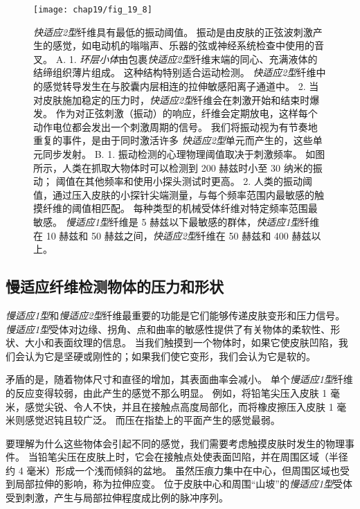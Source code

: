 \begin{figure}[htbp]
	\centering
	\texttt{[image: chap19/fig\_19\_8]}
	\caption{\textit{快适应2型}纤维具有最低的振动阈值。
		振动是由皮肤的正弦波刺激产生的感觉，如电动机的嗡嗡声、乐器的弦或神经系统检查中使用的音叉。
		A. 1. \textit{环层小体}由包裹\textit{快适应2型}纤维末端的同心、充满液体的结缔组织薄片组成。 这种结构特别适合运动检测。
		\textit{快适应2型}纤维中的感觉转导发生在与胶囊内层相连的拉伸敏感阳离子通道中。
		2. 当对皮肤施加稳定的压力时，\textit{快适应2型}纤维会在刺激开始和结束时爆发。
		作为对正弦刺激（振动）的响应，纤维会定期放电，这样每个动作电位都会发出一个刺激周期的信号。
		我们将振动视为有节奏地重复的事件，是由于同时激活许多 \textit{快适应2型}单元而产生的，这些单元同步发射\cite{talbot1968sense}。
		B. 1. 振动检测的心理物理阈值取决于刺激频率。
		如图所示，人类在抓取大物体时可以检测到 200 赫兹时小至 30 纳米的振动；
		阈值在其他频率和使用小探头测试时更高\cite{brisben1999detection}。
		2. 人类的振动阈值，通过压入皮肤的小探针尖端测量，与每个频率范围内最敏感的触摸纤维的阈值相匹配。 
		每种类型的机械受体纤维对特定频率范围最敏感。
		\textit{慢适应1型}纤维是 5 赫兹以下最敏感的群体，\textit{快适应1型}纤维在 10 赫兹和 50 赫兹之间，\textit{快适应2型}纤维在 50 赫兹和 400 赫兹以上\cite{mountcastle1972detection,johansson1982responses}。}
	\label{fig:19_8}
\end{figure}



\subsection{慢适应纤维检测物体的压力和形状}

\textit{慢适应1型}和\textit{慢适应2型}纤维最重要的功能是它们能够传递皮肤变形和压力信号。
\textit{慢适应1型}受体对边缘、拐角、点和曲率的敏感性提供了有关物体的柔软性、形状、大小和表面纹理的信息。
当我们触摸到一个物体时，如果它使皮肤凹陷，我们会认为它是坚硬或刚性的；如果我们使它变形，我们会认为它是软的。


矛盾的是，随着物体尺寸和直径的增加，其表面曲率会减小。
单个\textit{慢适应1型}纤维的反应变得较弱，由此产生的感觉不那么明显。
例如，将铅笔尖压入皮肤 1 毫米，感觉尖锐、令人不快，并且在接触点高度局部化，而将橡皮擦压入皮肤 1 毫米则感觉迟钝且较广泛。
而压在指垫上的平面产生的感觉最弱。


要理解为什么这些物体会引起不同的感觉，我们需要考虑触摸皮肤时发生的物理事件。
当铅笔尖压在皮肤上时，它会在接触点处使表面凹陷，并在周围区域（半径约 4 毫米）形成一个浅而倾斜的盆地。
虽然压痕力集中在中心，但周围区域也受到局部拉伸的影响，称为拉伸应变。
位于皮肤中心和周围“山坡”的\textit{慢适应1型}受体受到刺激，产生与局部拉伸程度成比例的脉冲序列。


